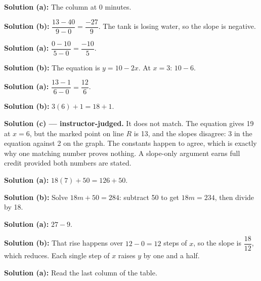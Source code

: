\documentclass[12pt]{article}
\begin{document}
\textbf{Solution (a):} The column at 0 minutes. 

\textbf{Solution (b):} $\dfrac{13 - 40}{9 - 0} = \dfrac{-27}{9}$. The tank is
losing water, so the slope is negative. 


\textbf{Solution (a):} $\dfrac{0 - 10}{5 - 0} = \dfrac{-10}{5}$. 

\textbf{Solution (b):} The equation is $y = 10 - 2x$. At $x = 3$: $10 - 6$.


\textbf{Solution (a):} $\dfrac{13 - 1}{6 - 0} = \dfrac{12}{6}$. 

\textbf{Solution (b):} $3(6) + 1 = 18 + 1$. 

\textbf{Solution (c) --- instructor-judged.} It does not match. The equation
gives 19 at $x = 6$, but the marked point on line $R$ is 13, and the slopes
disagree: 3 in the equation against 2 on the graph. The constants happen to
agree, which is exactly why one matching number proves nothing. A slope-only
argument earns full credit provided both numbers are stated.


\textbf{Solution (a):} $18(7) + 50 = 126 + 50$. 

\textbf{Solution (b):} Solve $18m + 50 = 284$: subtract 50 to get
$18m = 234$, then divide by 18. 


\textbf{Solution (a):} $27 - 9$. 

\textbf{Solution (b):} That rise happens over $12 - 0 = 12$ steps of $x$, so
the slope is $\dfrac{18}{12}$, which reduces. Each single step of $x$ raises
$y$ by one and a half. 


\textbf{Solution (a):} Read the last column of the table. 
\end{document}
